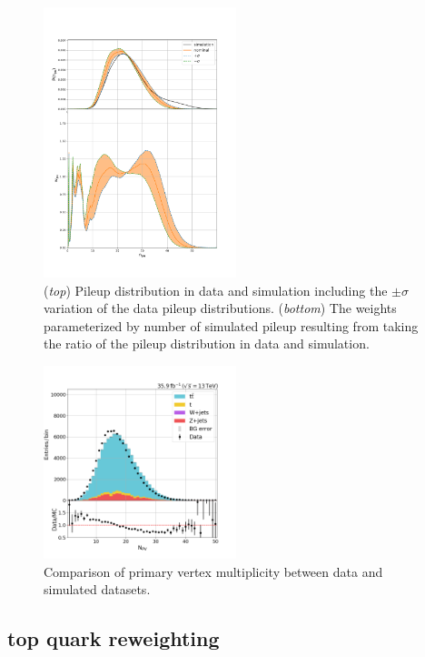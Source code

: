 \begin{figure}[h]
    \centering
    \includegraphics[width=0.5\textwidth]{figures/pileup_systematics}
    \caption{(\emph{top}) Pileup distribution in data and simulation
    including the $\pm\sigma$ variation of the data pileup
    distributions.  (\emph{bottom}) The weights parameterized by number
    of simulated pileup resulting from taking the ratio of the pileup
    distribution in data and simulation.
    \label{fig:pileup}
    }
\end{figure}

\begin{figure}[h]
    \centering
    \includegraphics[width=0.5\textwidth]{figures/n_pv}
    \caption{Comparison of primary vertex multiplicity between data and
    simulated datasets.
    \label{fig:npv}
    }
\end{figure}

\FloatBarrier
\subsection{top quark \pt reweighting}
\label{sec:top_pt}

